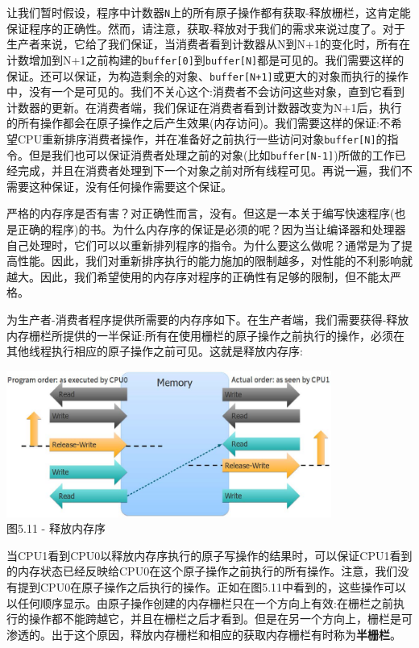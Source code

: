 让我们暂时假设，程序中计数器\texttt{N}上的所有原子操作都有获取-释放栅栏，这肯定能保证程序的正确性。然而，请注意，获取-释放对于我们的需求来说过度了。对于生产者来说，它给了我们保证，当消费者看到计数器从N到N+1的变化时，所有在计数增加到N+1之前构建的\texttt{buffer[0]}到\texttt{buffer[N]}都是可见的。我们需要这样的保证。还可以保证，为构造剩余的对象、\texttt{buffer[N+1]}或更大的对象而执行的操作中，没有一个是可见的。我们不关心这个:消费者不会访问这些对象，直到它看到计数器的更新。在消费者端，我们保证在消费者看到计数器改变为N+1后，执行的所有操作都会在原子操作之后产生效果(内存访问)。我们需要这样的保证:不希望CPU重新排序消费者操作，并在准备好之前执行一些访问对象\texttt{buffer[N]}的指令。但是我们也可以保证消费者处理之前的对象(比如\texttt{buffer[N-1]})所做的工作已经完成，并且在消费者处理到下一个对象之前对所有线程可见。再说一遍，我们不需要这种保证，没有任何操作需要这个保证。

严格的内存序是否有害？对正确性而言，没有。但这是一本关于编写快速程序(也是正确的程序)的书。为什么内存序的保证是必须的呢？因为当让编译器和处理器自己处理时，它们可以以重新排列程序的指令。为什么要这么做呢？通常是为了提高性能。因此，我们对重新排序执行的能力施加的限制越多，对性能的不利影响就越大。因此，我们希望使用的内存序对程序的正确性有足够的限制，但不能太严格。

为生产者-消费者程序提供所需要的内存序如下。在生产者端，我们需要获得-释放内存栅栏所提供的一半保证:所有在使用栅栏的原子操作之前执行的操作，必须在其他线程执行相应的原子操作之前可见。这就是释放内存序:

\begin{center}
\includegraphics[width=0.8\textwidth]{content/1/chapter5/images/11.jpg}\\
图5.11 - 释放内存序
\end{center}

当CPU1看到CPU0以释放内存序执行的原子写操作的结果时，可以保证CPU1看到的内存状态已经反映给CPU0在这个原子操作之前执行的所有操作。注意，我们没有提到CPU0在原子操作之后执行的操作。正如在图5.11中看到的，这些操作可以以任何顺序显示。由原子操作创建的内存栅栏只在一个方向上有效:在栅栏之前执行的操作都不能跨越它，并且在栅栏之后才看到。但是在另一个方向上，栅栏是可渗透的。出于这个原因，释放内存栅栏和相应的获取内存栅栏有时称为\textbf{半栅栏}。

